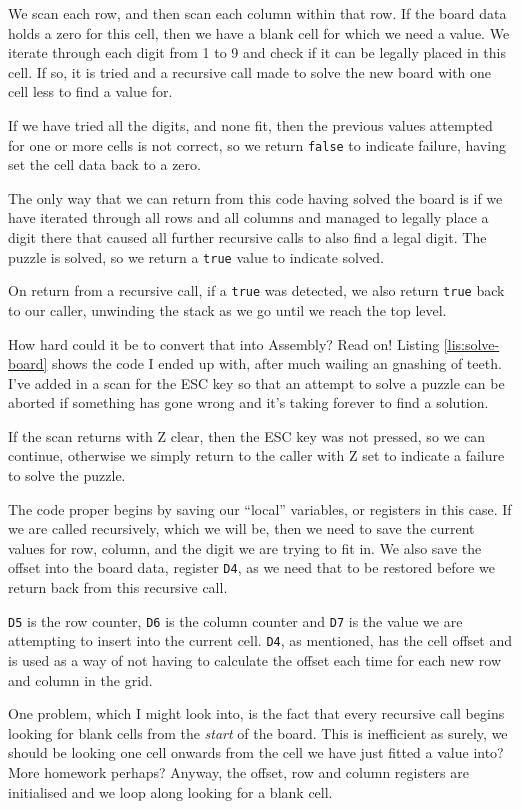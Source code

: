 We scan each row, and then scan each column within that row. If the
board data holds a zero for this cell, then we have a blank cell for
which we need a value. We iterate through each digit from 1 to 9 and
check if it can be legally placed in this cell. If so, it is tried
and a recursive call made to solve the new board with one cell less
to find a value for.

If we have tried all the digits, and none fit, then the previous values
attempted for one or more cells is not correct, so we return \texttt{false}
to indicate failure, having set the cell data back to a zero.

The only way that we can return from this code having solved the board
is if we have iterated through all rows and all columns and managed
to legally place a digit there that caused all further recursive calls
to also find a legal digit. The puzzle is solved, so we return a \texttt{true}
value to indicate solved.

On return from a recursive call, if a \texttt{true} was detected,
we also return \texttt{true} back to our caller, unwinding the stack
as we go until we reach the top level.

How hard could it be to convert that into Assembly? Read on! Listing
\ref{lis:solve-board} shows the code I ended up with, after much
wailing an gnashing of teeth. I've added in a scan for the ESC key
so that an attempt to solve a puzzle can be aborted if something has
gone wrong and it's taking forever to find a solution.

If the scan returns with Z clear, then the ESC key was not pressed,
so we can continue, otherwise we simply return to the caller with
Z set to indicate a failure to solve the puzzle.

The code proper begins by saving our ``local'' variables, or registers
in this case. If we are called recursively, which we will be, then
we need to save the current values for row, column, and the digit
we are trying to fit in. We also save the offset into the board data,
register \texttt{D4}, as we need that to be restored before we return
back from this recursive call.

\texttt{D5} is the row counter, \texttt{D6} is the column counter
and \texttt{D7} is the value we are attempting to insert into the
current cell. \texttt{D4}, as mentioned, has the cell offset and is
used as a way of not having to calculate the offset each time for
each new row and column in the grid.

One problem, which I might look into, is the fact that every recursive
call begins looking for blank cells from the \emph{start} of the board.
This is inefficient as surely, we should be looking one cell onwards
from the cell we have just fitted a value into? More homework perhaps?
Anyway, the offset, row and column registers are initialised and we
loop along looking for a blank cell.

